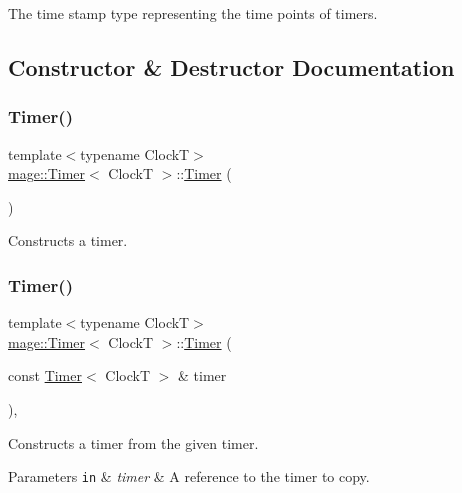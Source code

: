 The time stamp type representing the time points of timers. 

\subsection{Constructor \& Destructor Documentation}
\mbox{\label{classmage_1_1_timer_afdc4024388d57bbdda74854ee8a11683}} 
\subsubsection{\texorpdfstring{Timer()}{Timer()}\hspace{0.1cm}{\footnotesize\ttfamily [1/3]}}
{\footnotesize\ttfamily template$<$typename ClockT$>$ \\
\mbox{\hyperlink{classmage_1_1_timer}{mage\+::\+Timer}}$<$ ClockT $>$\+::\mbox{\hyperlink{classmage_1_1_timer}{Timer}} (\begin{DoxyParamCaption}{ }\end{DoxyParamCaption})\hspace{0.3cm}{\ttfamily [noexcept]}}

Constructs a timer. \mbox{\label{classmage_1_1_timer_a69aa4becb39ab40f378bd110db8ceb84}} 
\subsubsection{\texorpdfstring{Timer()}{Timer()}\hspace{0.1cm}{\footnotesize\ttfamily [2/3]}}
{\footnotesize\ttfamily template$<$typename ClockT$>$ \\
\mbox{\hyperlink{classmage_1_1_timer}{mage\+::\+Timer}}$<$ ClockT $>$\+::\mbox{\hyperlink{classmage_1_1_timer}{Timer}} (\begin{DoxyParamCaption}\item[{const \mbox{\hyperlink{classmage_1_1_timer}{Timer}}$<$ ClockT $>$ \&}]{timer }\end{DoxyParamCaption})\hspace{0.3cm}{\ttfamily [default]}, {\ttfamily [noexcept]}}

Constructs a timer from the given timer.


\begin{DoxyParams}[1]{Parameters}
\mbox{\tt in}  & {\em timer} & A reference to the timer to copy. \\
\hline
\end{DoxyParams}
\mbox{\label{classmage_1_1_timer_a7fb565cbe34c04df2713c43d3341cbc4}} 
